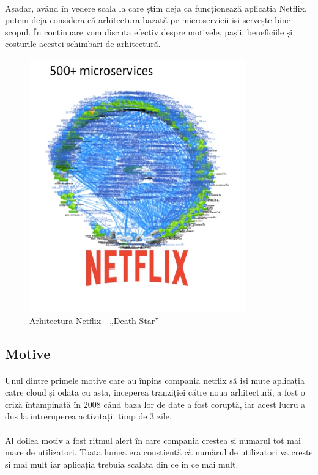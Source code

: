 \documentclass[12pt]{report}
\begin{document}
  	\paragraph{}Așadar, având în vedere scala la care știm deja ca funcționează aplicația Netflix, putem deja considera că arhitectura bazată pe microservicii isi servește bine scopul. În continuare vom discuta efectiv despre motivele, pașii, beneficiile și costurile acestei schimbari de arhitectură.
  	\begin{figure}[h]
  	\centering
  	\includegraphics[scale=.8]{deathstararhitecture}
	\caption{Arhitectura Netflix - „Death Star”}  
	\label{deathStarArhitecture}
  	\end{figure}
	\subsection{Motive}
	\paragraph{}Unul dintre primele motive care au înpins compania netflix să iși mute aplicația catre cloud și odata cu asta, inceperea tranziției către noua arhitectură, a fost o criză întampinată în 2008 când baza lor de date a fost coruptă, iar acest lucru a dus la intreruperea activitații timp de 3 zile. 
	\paragraph{}Al doilea motiv a fost ritmul alert în care compania crestea si numarul tot mai mare de utilizatori. Toată lumea era conștientă că numărul de utilizatori va creste si mai mult iar aplicația trebuia scalată din ce in ce mai mult.
\end{document}
